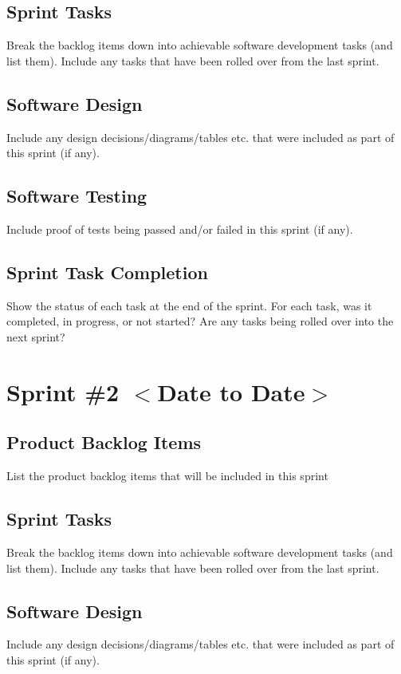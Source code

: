 \documentclass{scrreprt}
\begin{document}
% 
\subsection{Sprint Tasks}
Break the backlog items down into achievable software development tasks (and list them). Include any tasks that have been rolled over from the last sprint.

% 
\subsection{Software Design}
Include any design decisions/diagrams/tables etc. that were included as part of this sprint (if any).

% 
\subsection{Software Testing}
Include proof of tests being passed and/or failed in this sprint (if any).

% 
\subsection{Sprint Task Completion}
Show the status of each task at the end of the sprint. For each task, was it completed, in progress, or not started? Are any tasks being rolled over into the next sprint?

% 
% 
\section{Sprint \#2 $<$Date to Date$>$}

% 
\subsection{Product Backlog Items}
List the product backlog items that will be included in this sprint

% 
\subsection{Sprint Tasks}
Break the backlog items down into achievable software development tasks (and list them). Include any tasks that have been rolled over from the last sprint.

% 
\subsection{Software Design}
Include any design decisions/diagrams/tables etc. that were included as part of this sprint (if any).
\end{document}
